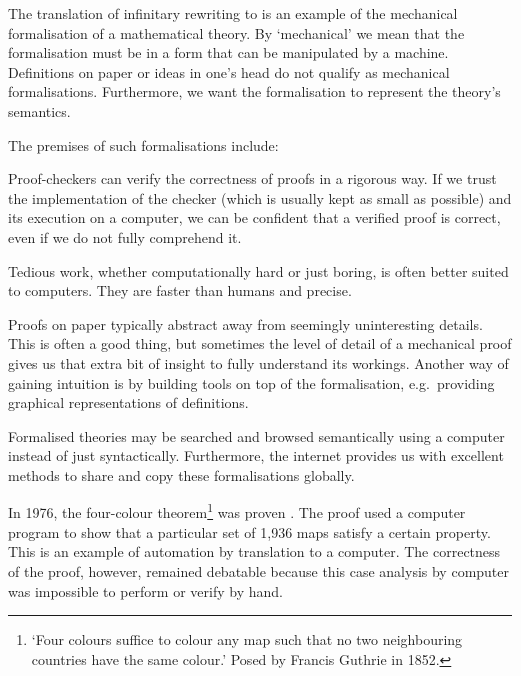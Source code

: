 The translation of infinitary rewriting to \Coq is an example of the
mechanical formalisation of a mathematical theory. By `mechanical' we
mean that the formalisation must be in a form that can be manipulated
by a machine. Definitions on paper or ideas in one's head do not
qualify as mechanical formalisations. Furthermore, we want the
formalisation to represent the theory's semantics.

The premises of such formalisations include:
\begin{compactdesc}
  \item[\normalfont{\emph{Confidence}}\hskip .5em]
    Proof-checkers can verify the correctness of proofs in a rigorous
    way. If we trust the implementation of the checker (which is
    usually kept as small as possible) and its execution on a
    computer, we can be confident that a verified proof is correct,
    even if we do not fully comprehend it.
  \item[\normalfont{\emph{Automation}}\hskip .5em]
    Tedious work, whether computationally hard or just boring, is
    often better suited to computers. They are faster than humans and
    precise.
  \item[\normalfont{\emph{Intuition}}\hskip .5em]
    Proofs on paper typically abstract away from seemingly
    uninteresting  details. This is often a good thing, but sometimes
    the level of detail of a mechanical proof gives us that extra bit
    of insight to fully understand its workings. Another way of
    gaining intuition is by building tools on top of the
    formalisation, e.g.\ providing graphical representations of
    definitions.
  \item[\normalfont{\emph{Availability}}\hskip .5em]
    Formalised theories may be searched and browsed semantically using
    a computer instead of just syntactically. Furthermore, the
    internet provides us with excellent methods to share and copy
    these formalisations globally.
\end{compactdesc}

In 1976, the four-colour theorem\footnote{`Four colours suffice to
  colour any map such that no two neighbouring countries have the same
  colour.' Posed by Francis Guthrie in 1852. } was proven
\citep{appel-haken-76}. The proof used a computer program to show that
a particular set of 1,936 maps satisfy a certain property. This is an
example of automation by translation to a computer. The correctness of
the proof, however, remained debatable because this case analysis by
computer was impossible to perform or verify by hand.

